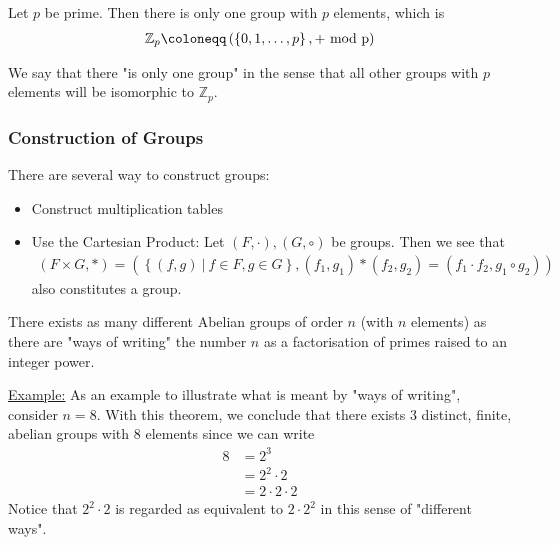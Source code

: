 \begin{theorem}
    Let \(p\) be prime. Then there is only one group with \(p\) elements, which is \begin{align*}
        \mathbb{Z} _p \coloneqq \left( \left\{ 0, 1, \dots, p \right\}, +\ \rm{mod }\ p  \right) 
    \end{align*}  
\end{theorem}
We say that there "is only one group" in the sense that all other groups with \(p\) elements will be isomorphic to \(\mathbb{Z} _p\).  

\subsubsection{Construction of Groups}
There are several way to construct groups: \begin{itemize}
    \item Construct multiplication tables
    \item Use the Cartesian Product: Let \((F, \cdot ), (G, \circ)\) be groups. Then we see that \begin{align*}
        \left( F \times G, *\right) = \left( \left\{ (f, g)\ \big| \ f \in F, g\in G \right\}, \left( f_1, g_1 \right) * \left( f_2, g_2 \right) = \left( f_1 \cdot f_2, g_1 \circ g_2\right)   \right)
    \end{align*}
    also constitutes a group.
\end{itemize}

\begin{theorem}
    There exists as many different Abelian groups of order \(n\) (with \(n\) elements) as there are "ways of writing" the number \(n\) as a factorisation of primes raised to an integer power.
\end{theorem}
\underline{Example:} As an example to illustrate what is meant by "ways of writing", consider \(n = 8\). With this theorem, we conclude that there exists 3 distinct, finite, abelian groups with 8 elements since we can write \begin{align*}
    8 &= 2^3\\
    &= 2^2 \cdot 2\\
    &= 2 \cdot 2 \cdot 2
\end{align*} 
Notice that \(2^2 \cdot 2\) is regarded as equivalent to \(2 \cdot 2^2\) in this sense of "different ways".  